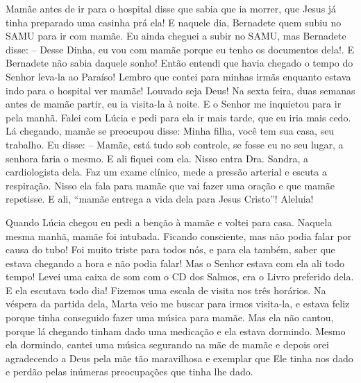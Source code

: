 \documentclass[
  brazil,
  a6paper,
  oneside,
  landscape,
  14pt]{scrbook}
\begin{document}
Mamãe antes de ir para o hospital disse que sabia que ia morrer, que
Jesus já tinha preparado uma casinha prá ela! E naquele dia, Bernadete
quem subiu no SAMU para ir com mamãe. Eu ainda cheguei a subir no SAMU,
mas Bernadete disse: -- Desse Dinha, eu vou com mamãe porque eu tenho os
documentos dela!. E Bernadete não sabia daquele sonho! Então entendi que
havia chegado o tempo do Senhor leva-la ao Paraíso! Lembro que contei
para minhas irmãs enquanto estava indo para o hospital ver mamãe!
Louvado seja Deus! Na sexta feira, duas semanas antes de mamãe partir,
eu ia visita-la à noite. E o Senhor me inquietou para ir pela manhã.
Falei com Lúcia e pedi para ela ir mais tarde, que eu iria mais cedo. Lá
chegando, mamãe se preocupou disse: Minha filha, você tem sua casa, seu
trabalho. Eu disse: -- Mamãe, está tudo sob controle, se fosse eu no seu
lugar, a senhora faria o mesmo. E ali fiquei com ela. Nisso entra Dra.
Sandra, a cardiologista dela. Faz um exame clínico, mede a pressão
arterial e escuta a respiração. Nisso ela fala para mamãe que vai fazer
uma oração e que mamãe repetisse. E ali, ``mamãe entrega a vida dela
para Jesus Cristo''! Aleluia!

Quando Lúcia chegou eu pedi a benção à mamãe e voltei para casa. Naquela
mesma manhã, mamãe foi intubada. Ficando consciente, mas não podia falar
por causa do tubo! Foi muito triste para todos nós, e para ela também,
saber que estava chegando a hora e não podia falar! Mas o Senhor estava
com ela ali todo tempo! Levei uma caixa de som com o CD dos Salmos, era
o Livro preferido dela. E ela escutava todo dia! Fizemos uma escala de
visita nos três horários. Na véspera da partida dela, Marta veio me
buscar para irmos visita-la, e estava feliz porque tinha conseguido
fazer uma música para mamãe. Mas ela não cantou, porque lá chegando
tinham dado uma medicação e ela estava dormindo. Mesmo ela dormindo,
cantei uma música segurando na mãe de mamãe e depois orei agradecendo a
Deus pela mãe tão maravilhosa e exemplar que Ele tinha nos dado e perdão
pelas inúmeras preocupações que tinha lhe dado.
\end{document}
